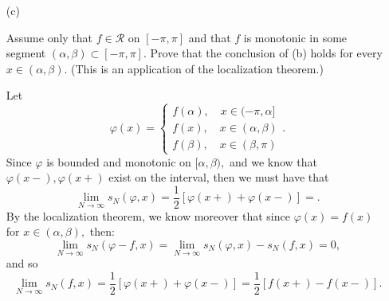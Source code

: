 \documentclass[11pt]{article}
\begin{document}
\begin{problem}
\begin{itemize}
\begin{solution}
\end{solution}
    \item[(c)] 
    \begin{problem}
            Assume only that $f \in \mathcal{R}$ on $[-\pi, \pi]$ and that $f$ is monotonic in some segment $(\alpha, \beta) \subset [-\pi, \pi]$. Prove that the conclusion of (b) holds for every $x \in (\alpha, \beta)$.
    (This is an application of the localization theorem.)
        \end{problem}
    \begin{solution}
        Let 
        \[\varphi(x) = \begin{cases}
            f(\alpha), \quad x\in (-\pi, \alpha]\\
            f(x), \quad x\in (\alpha, \beta)\\
            f(\beta), \quad x\in (\beta, \pi)
        \end{cases}.\]
        Since $\varphi$ is bounded and monotonic on $[\alpha, \beta),$ and we know that $\varphi(x-), \varphi(x+)$ exist on the interval, then we must have that 
        \[\lim_{N\to \infty} s_N(\varphi, x) = \frac{1}{2}[\varphi(x+) + \varphi(x-)] = .\] By the localization theorem, we know moreover that since $\varphi(x) = f(x)$ for $x\in (\alpha, \beta),$ then:
        \[\lim_{N\to \infty} s_N(\varphi - f,x) = \lim_{N\to \infty} s_N(\varphi,x) - s_N(f,x) = 0,\] and so
        \[\lim_{N\to \infty} s_N(f,x) = \frac{1}{2}[\varphi(x+) + \varphi(x-)] = \frac{1}{2}[f(x+) - f(x-)].\]
    \end{solution}
\end{itemize}
\end{problem}
\end{document}
